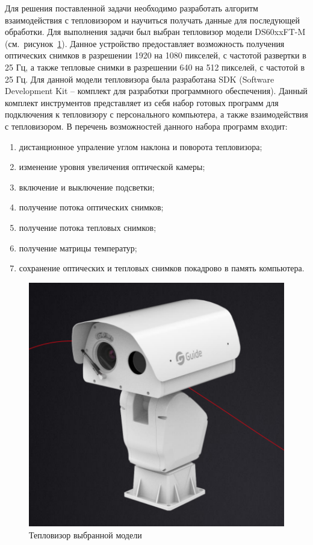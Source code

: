 \documentclass[14pt, a4paper]{extreport}
\begin{document}
	Для решения поставленной задачи необходимо разработать алгоритм взаимодействия с тепловизором и научиться получать данные для последующей обработки. Для выполнения задачи был выбран тепловизор модели DS60xxFT-M (см.~рисунок~\ref{fig:teploviser}). Данное устройство предоставляет возможность получения оптических снимков в разрешении 1920 на 1080 пикселей, с частотой развертки в 25 Гц, а также тепловые снимки в разрешении 640 на 512 пикселей, с частотой в 25 Гц. Для данной модели тепловизора была разработана SDK (Software Development Kit -- комплект для разработки программного обеспечения). Данный комплект инструментов представляет из себя набор готовых программ для подключения к тепловизору с персонального компьютера, а также взаимодействия с тепловизором. В перечень возможностей данного набора программ входит:
	
	\begin{enumerate}[label={\arabic*)}]
		\item дистанционное упраление углом наклона и поворота тепловизора;
		\item изменение уровня увеличения оптической камеры;
		\item включение и выключение подсветки;
		\item получение потока оптических снимков;
		\item получение потока тепловых снимков;
		\item получение матрицы температур;
		\item сохранение оптических и тепловых снимков покадрово в память компьютера.
	\end{enumerate}
	
	\begin{figure}[h!]
		\centering
		\includegraphics[width = 13cm]{image/chapter_2/teploviser}	
		\caption{Тепловизор выбранной модели}
		\label{fig:teploviser}
	\end{figure}
	
\end{document}
